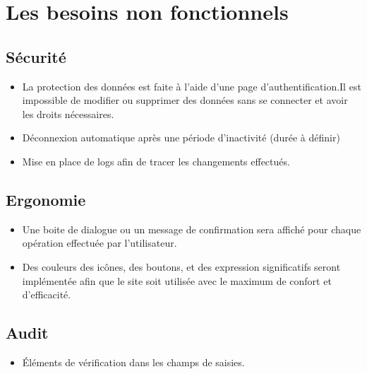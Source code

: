 \documentclass[12pt,a4paper]{article}
\begin{document}
\section{Les besoins non fonctionnels}
\subsection{Sécurité}
\begin{itemize}
 \item La protection des données est faite à l'aide d'une page d'authentification.Il est impossible de modifier ou supprimer des données sans se connecter et avoir les droits nécessaires. 
 \item Déconnexion automatique après une période d'inactivité (durée à définir)
 \item Mise en place de logs afin de tracer les changements effectués.
\end{itemize}
\subsection{Ergonomie}
\begin{itemize}
\item Une boite de dialogue ou un message de confirmation sera affiché pour chaque opération effectuée par l'utilisateur.
\item Des couleurs des icônes, des boutons, et des expression significatifs seront implémentée afin que le site soit utilisée avec le maximum de confort et d'efficacité.
\end{itemize}
\subsection{Audit}
\begin{itemize}
\item Éléments de vérification dans les champs de saisies.
\end{itemize}
\end{document}
